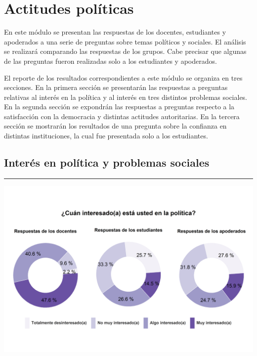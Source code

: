 \documentclass[
  14pt,
]{book}
\let\origfigure\figure
\let\endorigfigure\endfigure
\renewenvironment{figure}[1][2] {
  \expandafter\origfigure\expandafter[H]
} {
  \endorigfigure
}
\begin{document}
\hypertarget{actitudes-poluxedticas}{%
\chapter{Actitudes políticas}\label{actitudes-poluxedticas}}

En este módulo se presentan las respuestas de los docentes, estudiantes y apoderados a una serie de preguntas sobre temas políticos y sociales. El análisis se realizará comparando las respuestas de los grupos. Cabe precisar que algunas de las preguntas fueron realizadas solo a los estudiantes y apoderados.

El reporte de los resultados correspondientes a este módulo se organiza en tres secciones. En la primera sección se presentarán las respuestas a preguntas relativas al interés en la política y al interés en tres distintos problemas sociales. En la segunda sección se expondrán las respuestas a preguntas respecto a la satisfacción con la democracia y distintas actitudes autoritarias. En la tercera sección se mostrarán los resultados de una pregunta sobre la confianza en distintas instituciones, la cual fue presentada solo a los estudiantes.

\hypertarget{interuxe9s-en-poluxedtica-y-problemas-sociales}{%
\section{Interés en política y problemas sociales}\label{interuxe9s-en-poluxedtica-y-problemas-sociales}}

\begin{center}\rule{0.5\linewidth}{0.5pt}\end{center}

\begin{figure}[!ht]

{\centering \includegraphics[width=0.8\linewidth,]{images/graph_intpol} 

}

\caption{Interés en la política}\label{fig:unnamed-chunk-37}
\end{figure}
\end{document}
